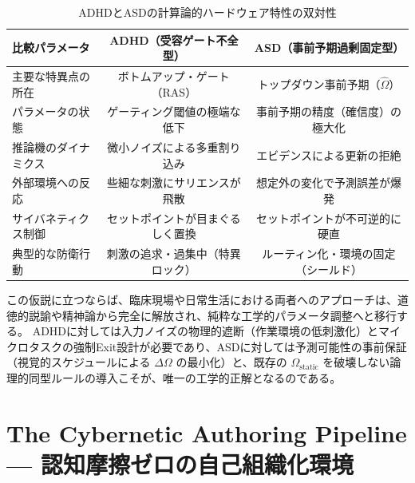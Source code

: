 \begin{table}[htbp]
\centering
\caption{ADHDとASDの計算論的ハードウェア特性の双対性}
\label{tab:adhd_asd_duality}
\begin{tabular}{lcc}
\toprule
\textbf{比較パラメータ} & \textbf{ADHD（受容ゲート不全型）} & \textbf{ASD（事前予期過剰固定型）} \\
\midrule
主要な特異点の所在 & ボトムアップ・ゲート（RAS） & トップダウン事前予期（$\hat{\Omega}$） \\
パラメータの状態 & ゲーティング閾値の極端な低下 & 事前予期の精度（確信度）の極大化 \\
推論機のダイナミクス & 微小ノイズによる多重割り込み & エビデンスによる更新の拒絶 \\
外部環境への反応 & 些細な刺激にサリエンスが飛散 & 想定外の変化で予測誤差が爆発 \\
サイバネティクス制御 & セットポイントが目まぐるしく置換 & セットポイントが不可逆的に硬直 \\
典型的な防衛行動 & 刺激の追求・過集中（特異ロック） & ルーティン化・環境の固定（シールド） \\
\bottomrule
\end{tabular}
\end{table}

この仮説に立つならば、臨床現場や日常生活における両者へのアプローチは、道徳的説諭や精神論から完全に解放され、純粋な工学的パラメータ調整へと移行する。
ADHDに対しては入力ノイズの物理的遮断（作業環境の低刺激化）とマイクロタスクの強制Exit設計が必要であり、ASDに対しては予測可能性の事前保証（視覚的スケジュールによる $\Delta \Omega$ の最小化）と、既存の $\Omega_{\mathrm{static}}$ を破壊しない論理的同型ルールの導入こそが、唯一の工学的正解となるのである。

\section{The Cybernetic Authoring Pipeline --- 認知摩擦ゼロの自己組織化環境}
\label{cha:authoring_pipeline}

\begin{abstract}
本章では、本書の全体系を決定論的に記述・コンパイル・デプロイするために構築された、完全キーボード駆動型・超低遅延オーサリング環境の全仕様を開示する。
WYSIWYGエディタに特有の認知ノイズを排し、認知帯域（CEN）のすべてを概念の自己組織化に専有させるための工学的設計である。
\end{abstract}

